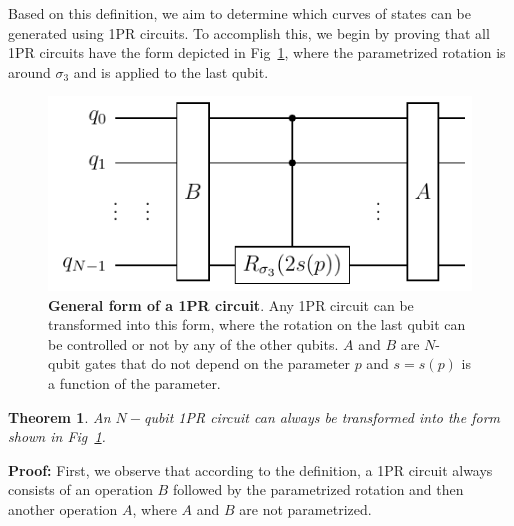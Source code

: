 \documentclass[10pt,letterpaper]{article} %
\newcommand{\fref}[1]{Fig~\ref{#1}}
\newtheorem{theorem}{Theorem}
\providecommand{\DIFaddtex}[1]{{\protect\color{blue}\uwave{#1}}} %
\providecommand{\DIFaddbegin}{} %
\providecommand{\DIFaddend}{} %
\providecommand{\DIFaddbeginFL}{} %
\providecommand{\DIFaddendFL}{} %
\providecommand{\DIFadd}[1]{\texorpdfstring{\DIFaddtex{#1}}{#1}} %
\newcommand{\DIFaddincludegraphics}[2][]{{\color{blue}\fbox{\DIFOincludegraphics[#1]{#2}}}} %
\DeclareRobustCommand{\DIFaddbegin}{\DIFOaddbegin \let\includegraphics\DIFaddincludegraphics} %
\DeclareRobustCommand{\DIFaddend}{\DIFOaddend \let\includegraphics\DIFOincludegraphics} %
\DeclareRobustCommand{\DIFaddbeginFL}{\DIFOaddbeginFL \let\includegraphics\DIFaddincludegraphics} %
\DeclareRobustCommand{\DIFaddendFL}{\DIFOaddendFL \let\includegraphics\DIFOincludegraphics} %
\begin{document}
Based on this definition, we aim to determine which curves of 
states can be generated using 1PR circuits. 
To accomplish this, we begin by proving that all 1PR circuits have 
the form depicted in \fref{Fig4},
where the parametrized rotation is around $\sigma_3$ and
is applied to the last qubit.

\begin{figure} %
\centering
\DIFaddbeginFL \includegraphics{OPR-circuit.pdf}
\DIFaddendFL \caption{\textbf{General form of a 1PR circuit}.
Any 1PR circuit can be transformed into this form,
where the rotation on the last qubit
can be controlled or not by any of the other qubits.
$A$ and $B$
are $N$-qubit gates that do not depend on the parameter $p$ and
$s= s(p)$ is a function of the parameter.}
\label{Fig4}
\end{figure} %

\begin{theorem}
An $N-$qubit 1PR circuit can always be transformed 
into the form shown in \fref{Fig4}.
\end{theorem}
\textbf{Proof:} 
First, we observe that according to the
definition, a 1PR circuit always consists of an operation $B$ followed 
by the parametrized rotation \DIFaddbegin \DIFadd{on a specific qubit }\DIFaddend and then another operation $A$, 
where $A$ and $B$ are not parametrized.
\end{document}
